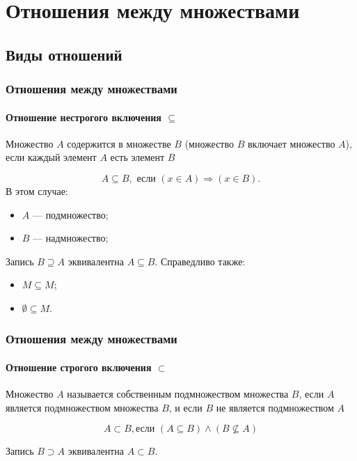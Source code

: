 \section{Отношения между множествами}


\subsection{Виды отношений}

\begin{frame}
    \frametitle{Отношения между множествами}
    \framesubtitle{Отношение нестрогого включения $\subseteq$}
    
    \begin{definition}
        Множество $A$ \alert{содержится} в множестве $B$ (множество $B$ \alert{включает} множество $A$), если каждый элемент $A$ есть элемент $B$
    \end{definition}
    
    \[A\subseteq B, \text{ если } (x\in A)\Rightarrow (x\in B).\]
    В этом случае:
    \begin{itemize}
        \item $A$ --- \alert{подмножество};
        \item $B$ --- \alert{надмножество};
    \end{itemize}
    
    Запись $B\supseteq A$ эквивалентна $A\subseteq B$. Справедливо также:
    \begin{itemize}
        \item $M\subseteq M$;
        \item $\emptyset\subseteq M$.
    \end{itemize}
\end{frame}

\begin{frame}
    \frametitle{Отношения между множествами}
    \framesubtitle{Отношение строгого включения $\subset$}
    
    \begin{definition}
        Множество $A$ называется \alert{собственным} подмножеством множества $B$, если $A$ является подмножеством множества $B$, и если $B$ не является подмножеством $A$
    \end{definition}
    
    \[A\subset B,\text{если $(A\subseteq B)\land(B\not\subseteq A)$}\]
    
    Запись $B\supset A$ эквивалентна $A\subset B$.
\end{frame}

